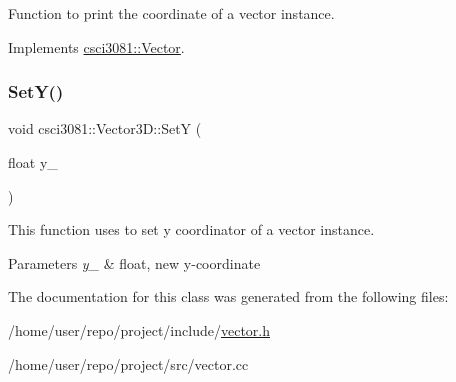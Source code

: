 Function to print the coordinate of a vector instance. 



Implements \hyperlink{classcsci3081_1_1Vector_a8f0661975d9635c803551cd778f75ed4}{csci3081\+::\+Vector}.

\mbox{\label{classcsci3081_1_1Vector3D_a6732592915b953a71dcaa8e9d87d294c}} 
\subsubsection{\texorpdfstring{Set\+Y()}{SetY()}}
{\footnotesize\ttfamily void csci3081\+::\+Vector3\+D\+::\+SetY (\begin{DoxyParamCaption}\item[{float}]{y\+\_\+ }\end{DoxyParamCaption})}



This function uses to set y coordinator of a vector instance. 


\begin{DoxyParams}{Parameters}
{\em y\+\_\+} & float, new y-\/coordinate \\
\hline
\end{DoxyParams}


The documentation for this class was generated from the following files\+:\begin{DoxyCompactItemize}
\item 
/home/user/repo/project/include/\hyperlink{vector_8h}{vector.\+h}\item 
/home/user/repo/project/src/vector.\+cc\end{DoxyCompactItemize}
